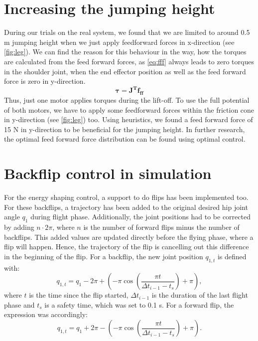 \documentclass[onecolumn, letter paper]{report}
\begin{document}
\chapter{Increasing the jumping height}
\label{sec:increasingheight}
During our trials on the real system, we found that we are limited to around 0.5 m jumping height when we just apply feedforward forces in x-direction (see \autoref{fig:leg}).
We can find the reason for this behaviour in the way, how the torques are calculated from the feed forward forces, as \autoref{eq:fff} always leads to zero torques in the shoulder joint, when the end effector position as well as the feed forward force is zero in y-direction. 
\begin{equation}
\label{eq:fff}
    \pmb{\tau} = \pmb{J^T} \pmb{f_{ff}}
\end{equation}
Thus, just one motor applies torques during the lift-off.
To use the full potential of both motors, we have to apply some feedforward forces within the friction cone in y-direction (see \autoref{fig:leg}) too. 
Using heuristics, we found a feed forward force of 15 N in y-direction to be beneficial for the jumping height. In further research, the optimal feed forward force distribution can be found using optimal control. 


\chapter{Backflip control in simulation}
For the energy shaping control, a support to do flips has been implemented too. For these backflips, a trajectory has been added to the original desired hip joint angle $q_1$ during flight phase. Additionally, the joint positions had to be corrected by adding $n\cdot 2\pi$, where $n$ is the number of forward flips minus the number of backflips. This added values are updated directly before the flying phase, where a flip  will happen. Hence, the trajectory of the flip is cancelling out this difference in the beginning of the flip.
For a backflip, the new joint position $q_{1,t}$ is defined with:
\begin{equation}
    q_{1,t} = q_1 - 2 \pi + (-\pi \cos(\frac{\pi t}{\Delta t_{i-1} - t_s}) + \pi),
\end{equation}
where $t$ is the time since the flip started, $\Delta t_{i-1}$ is the duration of the last flight phase and $t_s$ is a safety time, which was set to 0.1 s.
For a forward flip, the expression was accordingly:
\begin{equation}
    q_{1,t} = q_1 + 2 \pi - (-\pi \cos(\frac{\pi t}{\Delta t_{i-1} - t_s}) + \pi).
\end{equation}
\end{document}
